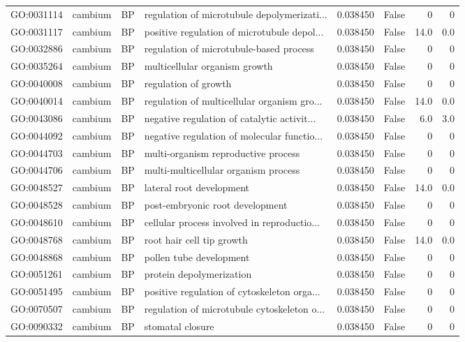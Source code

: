 \begin{longtable}{llllrlrr}
GO:0031114 & cambium & BP &   regulation of microtubule depolymerizati...  & 0.038450 &   False  & 0 & 0 \\
GO:0031117 & cambium & BP &   positive regulation of microtubule depol...  & 0.038450 &   False  & 14.0 & 0.0 \\ 
GO:0032886 & cambium & BP &   regulation of microtubule-based process  & 0.038450 &   False  & 0 & 0 \\
GO:0035264 & cambium & BP &   multicellular organism growth  & 0.038450 &   False  & 0 & 0 \\
GO:0040008 & cambium & BP &   regulation of growth  & 0.038450 &   False  & 0 & 0 \\
GO:0040014 & cambium & BP &   regulation of multicellular organism gro...  & 0.038450 &   False  & 14.0 & 0.0 \\ 
GO:0043086 & cambium & BP &   negative regulation of catalytic activit...  & 0.038450 &   False  & 6.0 & 3.0 \\ 
GO:0044092 & cambium & BP &   negative regulation of molecular functio...  & 0.038450 &   False  & 0 & 0 \\
GO:0044703 & cambium & BP &   multi-organism reproductive process  & 0.038450 &   False  & 0 & 0 \\
GO:0044706 & cambium & BP &   multi-multicellular organism process  & 0.038450 &   False  & 0 & 0 \\
GO:0048527 & cambium & BP &   lateral root development  & 0.038450 &   False  & 14.0 & 0.0 \\ 
GO:0048528 & cambium & BP &   post-embryonic root development  & 0.038450 &   False  & 0 & 0 \\
GO:0048610 & cambium & BP &   cellular process involved in reproductio...  & 0.038450 &   False  & 0 & 0 \\
GO:0048768 & cambium & BP &   root hair cell tip growth  & 0.038450 &   False  & 14.0 & 0.0 \\ 
GO:0048868 & cambium & BP &   pollen tube development  & 0.038450 &   False  & 0 & 0 \\
GO:0051261 & cambium & BP &   protein depolymerization  & 0.038450 &   False  & 0 & 0 \\
GO:0051495 & cambium & BP &   positive regulation of cytoskeleton orga...  & 0.038450 &   False  & 0 & 0 \\
GO:0070507 & cambium & BP &   regulation of microtubule cytoskeleton o...  & 0.038450 &   False  & 0 & 0 \\
GO:0090332 & cambium & BP &   stomatal closure  & 0.038450 &   False  & 0 & 0 \\

\end{longtable}
